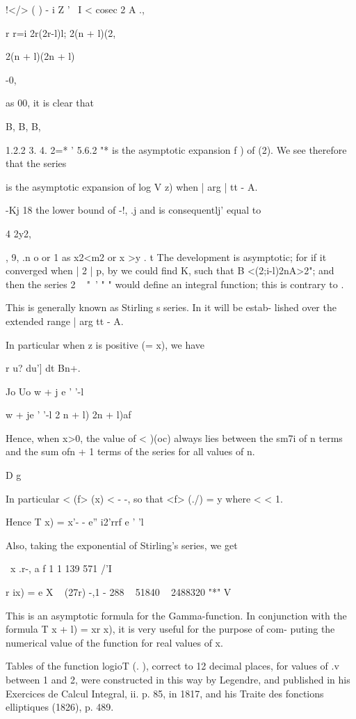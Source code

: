 !</> ( ) - i Z ' \ I < cosec 2 A .,

r r=i 2r(2r-l)l; 2(n + l)(2,

2(n + l)(2n + l)

-0,

as 00, it is clear that

B, B, B,

1.2.2 3. 4. 2=* ' 5.6.2 "* is the asymptotic expansion f ) of
(2). We see therefore that the series

is the asymptotic expansion of log V z) when | arg | tt - A.

-Kj 18 the lower bound of -!, .j and is consequentlj' equal to

4 2y2,

, 9, .n o or 1 as x2<m2 or x >y . t The development is asymptotic;
for if it converged when | 2 | p, by  we could find K, such that
B <(2;i-l)2nA>2"; and then the series 2 ~ "~' " " would define an
integral function; this is contrary to .

%
%

This is generally known as Stirling s series. In  it will be
estab- lished over the extended range | arg tt - A.

In particular when z is positive (= x), we have

r u? du'] dt Bn+.

Jo Uo w + j e ' '-l

w + je ' '-l 2 n + l) 2n + l)af

Hence, when x>0, the value of < )(oc) always lies between the sm7i of
n terms and the sum ofn + 1 terms of the series for all values of n.

D g

In particular < (f> (x) < - -, so that <f> (./) = y where < < 1.

Hence T x) = x'- - e'' i2'rrf e ' 'l

Also, taking the exponential of Stirling's series, we get

\ x .r-, a f 1 1 139 571 /'I

r ix) = e X ~ (27r) -,1 - 288 ~ 51840 ~ 2488320 "*" V

This is an asymptotic formula for the Gamma-function. In conjunction
with the formula T x + l) = xr x), it is very useful for the purpose
of com- puting the numerical value of the function for real values of
x.

Tables of the function logioT (. ), correct to 12 decimal places, for
values of .v between 1 and 2, were constructed in this way by
Legendre, and published in his Exercices de Calcul Integral, ii. p.
85, in 1817, and his Traite des fonctions elliptiques (1826), p. 489.


